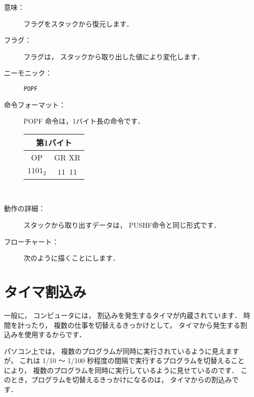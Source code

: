 \begin{description}
\item[意味：]フラグをスタックから復元します．

\item[フラグ：]フラグは，
スタックから取り出した値により変化します．

\item[ニーモニック：] {\tt POPF}

\item[命令フォーマット：]POPF 命令は，1バイト長の命令です．

\begin{tabular}{|c|c|} \hline
\multicolumn{2}{|c|}{第1バイト} \\
\hline
OP & GR XR \\
\hline
$1101_2$ & $11$~$11$ \\
\hline
\end{tabular}\\

\item[動作の詳細：]スタックから取り出すデータは，
PUSHF命令と同じ形式です．

\item[フローチャート：]
次のように描くことにします．

\begin{flushleft}
\epsfxsize=3cm
\end{flushleft}

\end{description}

\newpage
\section{タイマ割込み}

一般に，
コンピュータには，
割込みを発生するタイマが内蔵されています．
時間を計ったり，
複数の仕事を切替えるきっかけとして，
タイマから発生する割込みを使用するからです．

パソコン上では，
複数のプログラムが同時に実行されているように見えますが，
これは 1/10 〜 1/100 秒程度の間隔で実行するプログラムを切替えることにより，
複数のプログラムを同時に実行しているように見せているのです．
このとき，プログラムを切替えるきっかけになるのは，
タイマからの割込みです．

